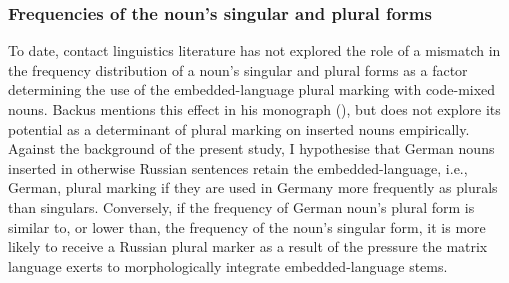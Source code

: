 \subsubsection{Frequencies of the noun's singular and plural forms}

To date, contact linguistics literature has not explored the role of a mismatch in the frequency distribution of a noun's singular and plural forms as a factor determining the use of the embedded-language plural marking with code-mixed nouns. Backus mentions this effect in his monograph (\citeyear{backus-two-1996}), but does not explore its potential as a determinant of plural marking on inserted nouns empirically. Against the background of the present study, I hypothesise that German nouns inserted in otherwise Russian sentences retain the embedded-language, i.e., German, plural marking if they are used in Germany more frequently as plurals than singulars. Conversely, if the frequency of German noun’s plural form is similar to, or lower than, the frequency of the noun's singular form, it is more likely to receive a Russian plural marker as a result of the pressure the matrix language exerts to morphologically integrate embedded-language stems. 

